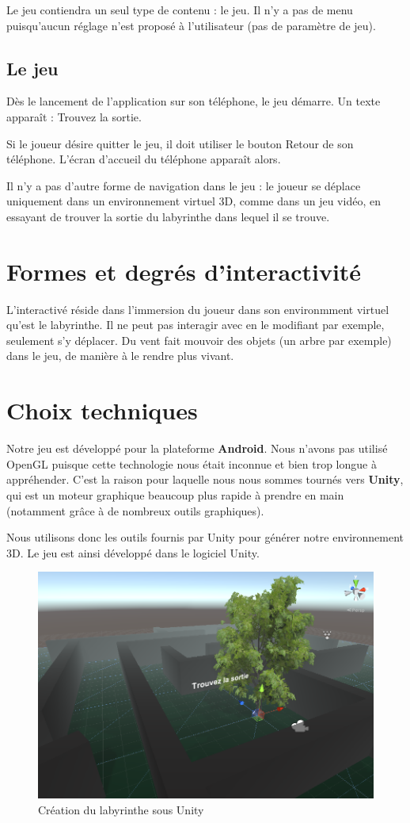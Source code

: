 Le jeu contiendra un seul type de contenu : le jeu. Il n'y a pas de menu puisqu'aucun réglage n'est proposé à l'utilisateur (pas de paramètre de jeu).

\subsection{Le jeu}
Dès le lancement de l'application sur son téléphone, le jeu démarre. Un texte apparaît : \og{}Trouvez la sortie\fg{}.

\medskip

Si le joueur désire quitter le jeu, il doit utiliser le bouton \og Retour\fg{} de son téléphone. L'écran d'accueil du téléphone apparaît alors.

\medskip

Il n'y a pas d'autre forme de navigation dans le jeu : le joueur se déplace uniquement dans un environnement virtuel 3D, comme dans un jeu vidéo, en essayant de trouver la sortie du labyrinthe dans lequel il se trouve.

\section{Formes et degrés d'interactivité}

L'interactivé réside dans l'immersion du joueur dans son environmment virtuel qu'est le labyrinthe. Il ne peut pas interagir avec en le modifiant par exemple, seulement s'y déplacer. Du vent fait mouvoir des objets (un arbre par exemple) dans le jeu, de manière à le rendre plus vivant.

\section{Choix techniques}

Notre jeu est développé pour la plateforme \textbf{Android}. Nous n'avons pas utilisé OpenGL puisque cette technologie nous était inconnue et bien trop longue à appréhender. C'est la raison pour laquelle nous nous sommes tournés vers \textbf{Unity}, qui est un moteur graphique beaucoup plus rapide à prendre en main (notamment grâce à de nombreux outils graphiques).

\medskip

Nous utilisons donc les outils fournis par Unity pour générer notre environnement 3D. Le jeu est ainsi développé dans le logiciel Unity.

\begin{figure}[h!]
  \centering
  \includegraphics[width=1.0\textwidth]{res/img/unity.png}
  \caption{Création du labyrinthe sous Unity}
\end{figure}